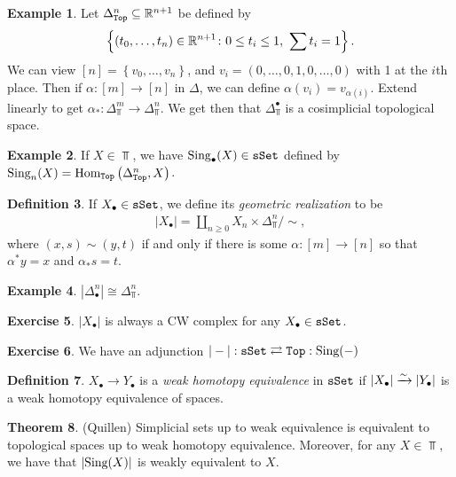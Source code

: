 \documentclass[12pt]{amsart}
\theoremstyle{definition}
\newtheorem{theorem}{Theorem}[section]
\newtheorem{definition}[theorem]{Definition}
\newtheorem{example}[theorem]{Example}
\newtheorem{exercise}[theorem]{Exercise}
\begin{document}
\begin{example} Let $\Delta^n_{\texttt{Top}} \subseteq \mathbb{R}^{n+1}$ be defined by
\begin{align*}
    \left\{ (t_0, \ldots, t_n) \in \R^{n+1} \colon 0 \le t_i \le 1,\ \sum t_i = 1 \right\}.
\end{align*}
We can view $[n] = \left\{ v_0, \ldots, v_n \right\}$, and $v_i = (0, \ldots, 0,1,0, \ldots, 0)$ with 1 at the $i$th place. Then if $\alpha : [m] \to [n]$ in $\Delta$, we can define $\alpha(v_i) =v_{\alpha(i)}$. Extend linearly to get $\alpha_\ast : \Delta^m_\Top \to \Delta^n_\Top$. We get then that $\Delta^\bullet_\Top$ is a cosimplicial topological space.
\end{example}

\begin{example} If $X \in \Top$, we have $\text{Sing}_\bullet(X) \in \texttt{sSet}$ defined by $\text{Sing}_n(X) = \text{Hom}_{\texttt{Top}} \left( \Delta_{\texttt{Top}}^n, X \right)$.
\end{example}

\begin{definition} If $X_\bullet \in \texttt{sSet}$, we define its \textit{geometric realization} to be
\begin{align*}
    |X_\bullet| = \amalg_{n\ge 0} X_n \times \Delta^n_\Top / \sim,
\end{align*}
where $(x,s)\sim (y,t)$ if and only if there is some $\alpha : [m] \to [n]$ so that $\alpha^\ast y = x$ and $\alpha_\ast s = t$.
\end{definition}


\begin{example} $|\Delta^n_\bullet| \cong \Delta^n_\Top$.
\end{example}

\begin{exercise} $|X_\bullet|$ is always a CW complex for any $X_\bullet \in \texttt{sSet}$.
\end{exercise}

\begin{exercise} We have an adjunction $|-| : \texttt{sSet} \rightleftarrows \texttt{Top}: \text{Sing}(-)$
\end{exercise}

\begin{definition} $X_\bullet \to Y_\bullet$ is a \textit{weak homotopy equivalence} in $\texttt{sSet}$ if $|X_\bullet| \xrightarrow{\sim} |Y_\bullet|$ is a weak homotopy equivalence of spaces.
\end{definition}

\begin{theorem} (Quillen) Simplicial sets up to weak equivalence is equivalent to topological spaces up to weak homotopy equivalence. Moreover, for any $X\in \Top$, we have that $|\text{Sing}(X)|$ is weakly equivalent to $X$.
\end{theorem}
\end{document}
